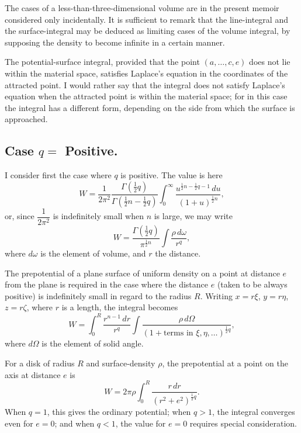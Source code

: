 \documentclass[11pt,a4paper]{book}
\begin{document}
\begin{art}
The cases of a less-than-three-dimensional volume are in the present memoir considered only incidentally. It is sufficient to remark that the line-integral and the surface-integral may be deduced as limiting cases of the volume integral, by supposing the density to become infinite in a certain manner.
\end{art}

\begin{art}
The potential-surface integral, provided that the point $(a, \ldots, c, e)$ does not lie within the material space, satisfies Laplace's equation in the coordinates of the attracted point. I would rather say that the integral does not satisfy Laplace's equation when the attracted point is within the material space; for in this case the integral has a different form, depending on the side from which the surface is approached.
\end{art}

\subsection*{Case $q = $ Positive.}

\begin{art}
I consider first the case where $q$ is positive. The value is here
\[
W = \frac{1}{2\pi^2}\frac{\Gamma(\frac{1}{2}q)}{\Gamma(\frac{1}{2}n - \frac{1}{2}q)} \int_0^{\infty} \frac{u^{\frac{1}{2}n - \frac{1}{2}q - 1}\,du}{(1 + u)^{\frac{1}{2}n}},
\]
or, since $\dfrac{1}{2\pi^2}$ is indefinitely small when $n$ is large, we may write
\[
W = \frac{\Gamma(\frac{1}{2}q)}{\pi^{\frac{1}{2}n}} \int \frac{\rho\,d\omega}{r^q},
\]
where $d\omega$ is the element of volume, and $r$ the distance.
\end{art}

\begin{art}
The prepotential of a plane surface of uniform density on a point at distance $e$ from the plane is required in the case where the distance $e$ (taken to be always positive) is indefinitely small in regard to the radius $R$. Writing $x = r\xi$, $y = r\eta$, $z = r\zeta$, where $r$ is a length, the integral becomes
\[
W = \int_0^R \frac{r^{n-1}\,dr}{r^q} \int \frac{\rho\,d\Omega}{(1 + \text{terms in } \xi, \eta, \ldots)^{\frac{1}{2}q}},
\]
where $d\Omega$ is the element of solid angle.
\end{art}

\begin{art}
For a disk of radius $R$ and surface-density $\rho$, the prepotential at a point on the axis at distance $e$ is
\[
W = 2\pi\rho \int_0^R \frac{r\,dr}{(r^2 + e^2)^{\frac{1}{2}q}}.
\]
When $q=1$, this gives the ordinary potential; when $q > 1$, the integral converges even for $e=0$; and when $q < 1$, the value for $e=0$ requires special consideration.
\end{art}
\end{document}
